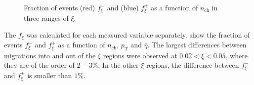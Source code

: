 \begin{figure}[h!]
\begin{subfigure}{.49\textwidth}
 	\end{subfigure}
 	\begin{minipage}{.49\textwidth}
 		\caption{Fraction of events (red) $f_{\xi}^-$ and (blue)  $f_{\xi}^+$ as a function of $n_\textrm{ch}$ in three ranges of $\xi$.}
 		\label{fig:xi_correction_nch}
 	\end{minipage}
 	
 \end{figure}
 
 The $f_{\xi}$ was calculated for each measured variable separately.  show the fraction of events $f_{\xi}^-$ and $f_{\xi}^+$ as a function of $n_\textrm{ch}$, $p_\textrm{T}$ and $\bar{\eta}$. The largest differences between migrations into and out of the $\xi$ regions were observed at $0.02<\xi<0.05$, where they are of the order of $2-3\%$. In the other $\xi$ regions, the difference between $f_{\xi}^-$ and $f_{\xi}^+$  is smaller than $1\%$.
